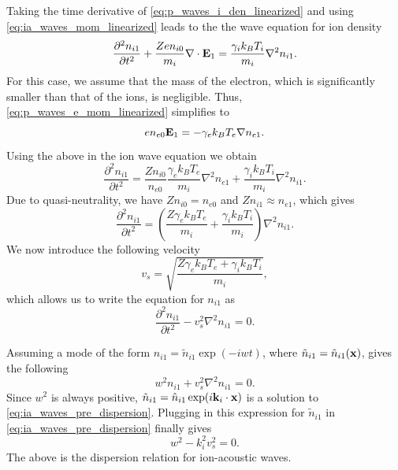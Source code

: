 \documentclass[a4paper,11pt]{report}
\begin{document}
Taking the time derivative of \cref{eq:p_waves_i_den_linearized} and using \cref{eq:ia_waves_mom_linearized} leads to the the wave equation for ion density
\begin{equation}
    \label{eq:ia_waves_den_combined}
    \frac{\partial^2 n_{i1}}{\partial t^2} + \frac{Z e n_{i0}}{m_i} \nabla \cdot \mathbf{E}_1 = \frac{\gamma_i k_B T_i}{m_i} \nabla^2 n_{i1}.
\end{equation}
For this case, we assume that the mass of the electron, which is significantly smaller than that of the ions, is negligible. Thus, \cref{eq:p_waves_e_mom_linearized} simplifies to 
\begin{equation}
    \label{eq:ia_waves_E}
    e n_{e0} \mathbf{E}_1 = -\gamma_e k_B T_e \nabla n_{e1}.
\end{equation}
Using the above in the ion wave equation we obtain
\begin{equation*}
    \frac{\partial^2 n_{i1}}{\partial t^2} = \frac{Z n_{i0}}{ n_{e0}} \frac{\gamma_e k_B T_e}{m_i} \nabla^2 n_{e1} + \frac{\gamma_i k_B T_i}{m_i} \nabla^2 n_{i1}.
\end{equation*}
Due to quasi-neutrality, we have $Z n_{i0} = n_{e0}$ and $Z n_{i1} \approx n_{e1}$, which gives
\begin{equation*}
    \frac{\partial^2 n_{i1}}{\partial t^2} = \left ( \frac{Z \gamma_e k_B T_e}{m_i} + \frac{\gamma_i k_B T_i}{m_i} \right ) \nabla^2 n_{i1}.
\end{equation*}
We now introduce the following velocity
\begin{equation}
    \label{eq:ia_waves_vs}
    v_s = \sqrt{ \frac{Z \gamma_e k_B T_e + \gamma_i k_B T_i }{m_i} },
\end{equation}
which allows us to write the equation for $n_{i1}$ as
\begin{equation}
    \frac{\partial^2 n_{i1}}{\partial t^2} - v_s^2 \nabla^2 n_{i1} = 0.
\end{equation}

Assuming a mode of the form $n_{i1} = \tilde{n}_{i1} \exp (-iwt)$, where $\tilde{n}_{i1} = \tilde{n}_{i1}(\mathbf{x})$, gives the following
\begin{equation}
    \label{eq:ia_waves_pre_dispersion}
    w^2 n_{i1} + v_s^2 \nabla^2 n_{i1} = 0.
\end{equation}
Since $w^2$ is always positive, $\tilde{n}_{i1} = \hat{n}_{i1} \exp (i \mathbf{k}_i \cdot \mathbf{x})$ is a solution to \cref{eq:ia_waves_pre_dispersion}. Plugging in this expression for $\tilde{n}_{i1}$ in \cref{eq:ia_waves_pre_dispersion} finally gives
\begin{equation}
    w^2 - k_i^2 v_s^2 = 0.
\end{equation}
The above is the dispersion relation for ion-acoustic waves.
\end{document}
